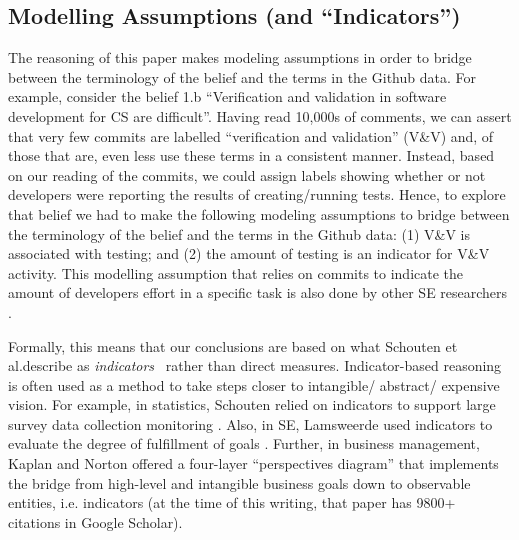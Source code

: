 \documentclass[sigconf,review,anonymous]{acmart}
\begin{document}
\subsection{Modelling Assumptions (and ``Indicators'')}\label{model}

 
The reasoning of this 
paper makes
modeling assumptions in order to bridge between the terminology of the belief and the terms in the Github data.  For example, consider the belief 1.b ``Verification and validation in software development for CS are difficult''.  
Having read 10,000s of comments, we can assert that 
very few commits are labelled  ``verification and validation'' (V\&V) and, of those that are,
even less use these terms in a consistent manner. Instead, based on our reading of the commits, we could assign labels showing whether or not developers were reporting the results of creating/running tests. Hence, to explore that belief we had to make the following modeling assumptions to bridge between the terminology of the belief and the terms in the Github data: (1) V\&V is associated with testing; and (2) the amount of testing is an indicator for V\&V activity. This modelling assumption that relies on commits to indicate the amount of developers effort in a specific  task is also done by other SE researchers \cite{vasilescu16_limit, xia2019sequential}.


Formally, this means that our conclusions are based on what
Schouten et al.describe as
 {\em indicators}~\cite{schouten2010indicators} rather than direct measures. Indicator-based reasoning is often used as a method to take steps closer to intangible/ abstract/ expensive vision. For example,
 in statistics, Schouten relied on indicators to support large survey data collection monitoring \cite{schouten2010indicators}. Also, in SE, Lamsweerde used indicators to evaluate the degree of fulfillment of goals \cite{vanLamsweerde2009_requirement}.
 Further, in business 
 management, Kaplan and Norton \cite{kaplan1996using} offered a four-layer ``perspectives diagram'' that implements the bridge from high-level and intangible business goals down
 to observable entities, i.e. indicators (at the time of this
 writing, that paper has  9800+ citations in Google Scholar).
   


 
\end{document}
